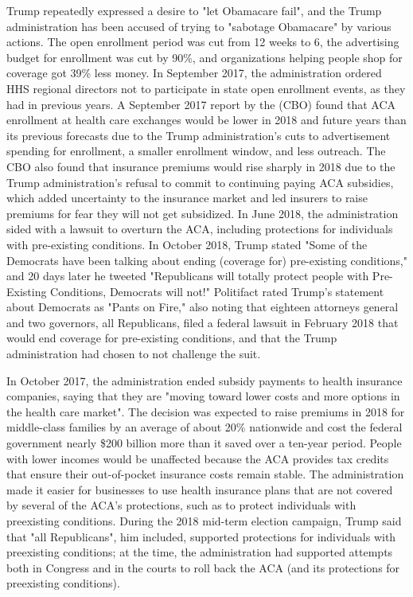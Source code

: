 Trump repeatedly expressed a desire to "let Obamacare fail", and the
Trump administration has been accused of trying to "sabotage Obamacare"
by various actions. The open enrollment period was cut from 12 weeks to
6, the advertising budget for enrollment was cut by 90\%, and
organizations helping people shop for coverage got 39\% less money. In
September 2017, the administration ordered HHS regional directors not to
participate in state open enrollment events, as they had in previous
years. A September 2017 report by the (CBO) found that ACA enrollment at
health care exchanges would be lower in 2018 and future years than its
previous forecasts due to the Trump administration's cuts to
advertisement spending for enrollment, a smaller enrollment window, and
less outreach. The CBO also found that insurance premiums would rise
sharply in 2018 due to the Trump administration's refusal to commit to
continuing paying ACA subsidies, which added uncertainty to the
insurance market and led insurers to raise premiums for fear they will
not get subsidized. In June 2018, the administration sided with a
lawsuit to overturn the ACA, including protections for individuals with
pre-existing conditions. In October 2018, Trump stated "Some of the
Democrats have been talking about ending (coverage for) pre-existing
conditions," and 20 days later he tweeted "Republicans will totally
protect people with Pre-Existing Conditions, Democrats will not!"
Politifact rated Trump's statement about Democrats as "Pants on Fire,"
also noting that eighteen attorneys general and two governors, all
Republicans, filed a federal lawsuit in February 2018 that would end
coverage for pre-existing conditions, and that the Trump administration
had chosen to not challenge the suit.

In October 2017, the administration ended subsidy payments to health
insurance companies, saying that they are "moving toward lower costs and
more options in the health care market". The decision was expected to
raise premiums in 2018 for middle-class families by an average of about
20\% nationwide and cost the federal government nearly \$200 billion
more than it saved over a ten-year period. People with lower incomes
would be unaffected because the ACA provides tax credits that ensure
their out-of-pocket insurance costs remain stable. The administration
made it easier for businesses to use health insurance plans that are not
covered by several of the ACA's protections, such as to protect
individuals with preexisting conditions. During the 2018 mid-term
election campaign, Trump said that "all Republicans", him included,
supported protections for individuals with preexisting conditions; at
the time, the administration had supported attempts both in Congress and
in the courts to roll back the ACA (and its protections for preexisting
conditions).

